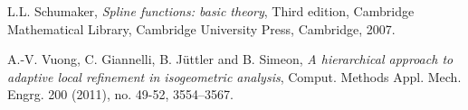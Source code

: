 \documentclass[12pt,a4paper,pdftex]{article}
\theoremstyle{plain}
\theoremstyle{definition}
\theoremstyle{remark}
\begin{document}
\begin{thebibliography}{1}
L.L. Schumaker, \emph{Spline functions: basic theory}, Third edition, Cambridge Mathematical Library, Cambridge University Press, Cambridge, 2007.

% 

% 


A.-V. Vuong, C. Giannelli, B. J\"uttler and B. Simeon, \emph{A hierarchical approach to adaptive local refinement in isogeometric analysis}, Comput. Methods Appl. Mech. Engrg. 200 (2011), no. 49-52, 3554--3567.


\end{thebibliography}
\end{document}
